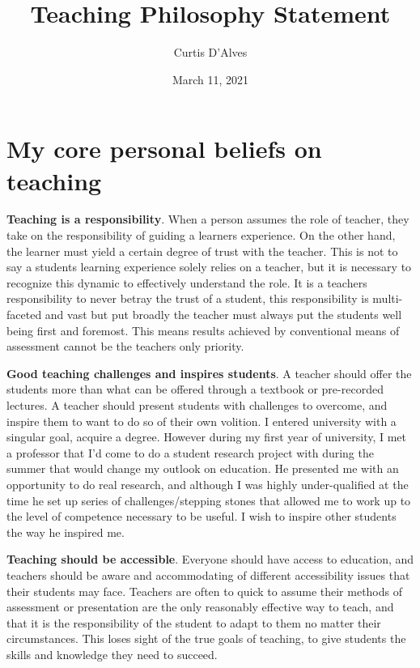 \documentclass{article}
\author{Curtis D'Alves}
\date{March 11, 2021}
\title{Teaching Philosophy Statement}
\begin{document}
\maketitle


\section{My core personal beliefs on teaching}
\label{sec:org70bffab}

\textbf{Teaching is a responsibility}. When a person assumes the role of teacher,
they take on the responsibility of guiding a learners experience. On the other
hand, the learner must yield a certain degree of trust with the teacher. This
is not to say a students learning experience solely relies on a teacher, but
it is necessary to recognize this dynamic to effectively understand the role.
It is a teachers responsibility to never betray the trust of a student, this
responsibility is multi-faceted and vast but put broadly the teacher must
always put the students well being first and foremost. This means results
achieved by conventional means of assessment cannot be the teachers only
priority.

\noindent
\textbf{Good teaching challenges and inspires students}. A teacher should offer the
students more than what can be offered through a textbook or pre-recorded
lectures. A teacher should present students with challenges to overcome, and
inspire them to want to do so of their own volition. I entered university with
a singular goal, acquire a degree. However during my first year of university,
I met a professor that I'd come to do a student research project with during
the summer that would change my outlook on education. He presented me with an
opportunity to do real research, and although I was highly under-qualified at
the time he set up series of challenges/stepping stones that allowed me to
work up to the level of competence necessary to be useful. I wish to inspire
other students the way he inspired me.

\noindent
\textbf{Teaching should be accessible}. Everyone should have access to education, and
teachers should be aware and accommodating of different accessibility issues
that their students may face. Teachers are often to quick to assume their
methods of assessment or presentation are the only reasonably effective way to
teach, and that it is the responsibility of the student to adapt to them no matter
their circumstances. This loses sight of the true goals of teaching, to give
students the skills and knowledge they need to succeed.
\end{document}
